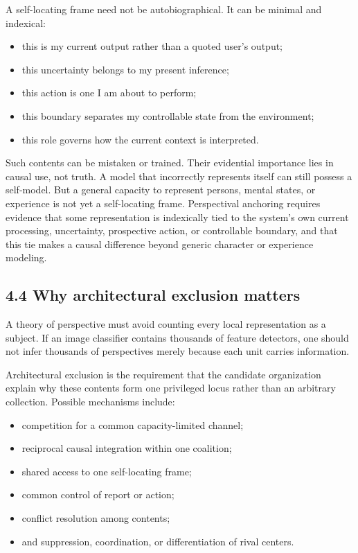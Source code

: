 \documentclass[
  11pt,
]{article}
\providecommand{\tightlist}{%
  \setlength{\itemsep}{0pt}\setlength{\parskip}{0pt}}
\begin{document}
A self-locating frame need not be autobiographical. It can be minimal
and indexical:

\begin{itemize}
\tightlist
\item
  this is my current output rather than a quoted user's output;
\item
  this uncertainty belongs to my present inference;
\item
  this action is one I am about to perform;
\item
  this boundary separates my controllable state from the environment;
\item
  this role governs how the current context is interpreted.
\end{itemize}

Such contents can be mistaken or trained. Their evidential importance
lies in causal use, not truth. A model that incorrectly represents
itself can still possess a self-model. But a general capacity to
represent persons, mental states, or experience is not yet a
self-locating frame. Perspectival anchoring requires evidence that some
representation is indexically tied to the system's own current
processing, uncertainty, prospective action, or controllable boundary,
and that this tie makes a causal difference beyond generic character or
experience modeling.

\subsection{4.4 Why architectural exclusion
matters}\label{why-architectural-exclusion-matters}

A theory of perspective must avoid counting every local representation
as a subject. If an image classifier contains thousands of feature
detectors, one should not infer thousands of perspectives merely because
each unit carries information.

Architectural exclusion is the requirement that the candidate
organization explain why these contents form one privileged locus rather
than an arbitrary collection. Possible mechanisms include:

\begin{itemize}
\tightlist
\item
  competition for a common capacity-limited channel;
\item
  reciprocal causal integration within one coalition;
\item
  shared access to one self-locating frame;
\item
  common control of report or action;
\item
  conflict resolution among contents;
\item
  and suppression, coordination, or differentiation of rival centers.
\end{itemize}
\end{document}
